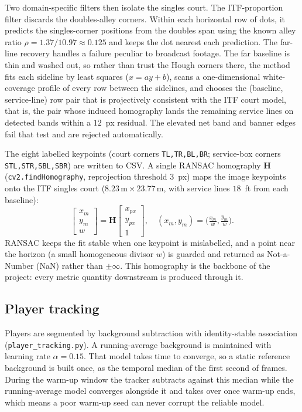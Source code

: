 \documentclass[11pt]{article}
\begin{document}
Two domain-specific filters then isolate the singles court. The ITF-proportion filter discards the doubles-alley corners. Within each horizontal row of dots, it predicts the singles-corner positions from the doubles span using the known alley ratio $\rho = 1.37/10.97 \approx 0.125$ and keeps the dot nearest each prediction. The far-line recovery handles a failure peculiar to broadcast footage. The far baseline is thin and washed out, so rather than trust the Hough corners there, the method fits each sideline by least squares ($x = ay + b$), scans a one-dimensional white-coverage profile of every row between the sidelines, and chooses the (baseline, service-line) row pair that is projectively consistent with the ITF court model, that is, the pair whose induced homography lands the remaining service lines on detected bands within a $12$~px residual. The elevated net band and banner edges fail that test and are rejected automatically.

The eight labelled keypoints (court corners \texttt{TL,TR,BL,BR}; service-box corners \texttt{STL,STR,SBL,SBR}) are written to CSV. A single RANSAC homography $\mathbf{H}$ (\texttt{cv2.findHomography}, reprojection threshold $3$~px) maps the image keypoints onto the ITF singles court ($8.23\,\text{m}\times 23.77\,\text{m}$, with service lines $18$~ft from each baseline):
\begin{equation}
\begin{bmatrix} x_m \\ y_m \\ w \end{bmatrix} = \mathbf{H}\begin{bmatrix} x_{px} \\ y_{px} \\ 1 \end{bmatrix},
\quad (x_m, y_m) = \Big(\tfrac{x_m}{w}, \tfrac{y_m}{w}\Big).
\end{equation}
RANSAC keeps the fit stable when one keypoint is mislabelled, and a point near the horizon (a small homogeneous divisor $w$) is guarded and returned as Not-a-Number (NaN) rather than $\pm\infty$. This homography is the backbone of the project: every metric quantity downstream is produced through it.

\subsection{Player tracking}
Players are segmented by background subtraction with identity-stable association (\texttt{player\_tracking.py}). A running-average background is maintained with learning rate $\alpha = 0.15$. That model takes time to converge, so a static reference background is built once, as the temporal median of the first second of frames. During the warm-up window the tracker subtracts against this median while the running-average model converges alongside it and takes over once warm-up ends, which means a poor warm-up seed can never corrupt the reliable model.
\end{document}
